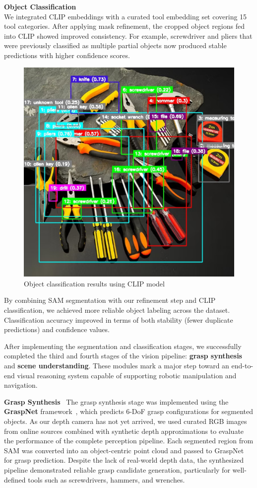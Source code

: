 \documentclass[12pt]{extarticle}
\begin{document}
\textbf{Object Classification} \\
We integrated CLIP embeddings with a curated tool embedding set covering 15 tool categories. After applying mask refinement, the cropped object regions fed into CLIP showed improved consistency. For example, screwdriver and pliers that were previously classified as multiple partial objects now produced stable predictions with higher confidence scores.

\begin{figure}[htbp]
    \centering
    \includegraphics[width=0.5\linewidth]{images/clips_img.png}
    \caption{Object classification results using CLIP model}
    \label{fig: clips_img}
\end{figure}

By combining SAM segmentation with our refinement step and CLIP classification, we achieved more reliable object labeling across the dataset. Classification accuracy improved in terms of both stability (fewer duplicate predictions) and confidence values.

After implementing the segmentation and classification stages, we successfully completed the third and fourth stages of the vision pipeline: \textbf{grasp synthesis} and \textbf{scene understanding}. These modules mark a major step toward an end-to-end visual reasoning system capable of supporting robotic manipulation and navigation. \

\textbf{Grasp Synthesis} \
The grasp synthesis stage was implemented using the \textbf{GraspNet} framework~\cite{hanwen2024_grasp}, which predicts 6-DoF grasp configurations for segmented objects. As our depth camera has not yet arrived, we used curated RGB images from online sources combined with synthetic depth approximations to evaluate the performance of the complete perception pipeline. Each segmented region from SAM was converted into an object-centric point cloud and passed to GraspNet for grasp prediction. Despite the lack of real-world depth data, the synthesized pipeline demonstrated reliable grasp candidate generation, particularly for well-defined tools such as screwdrivers, hammers, and wrenches.
\end{document}
